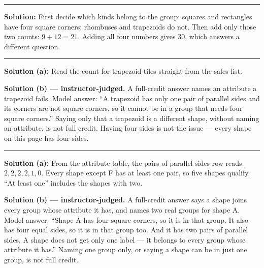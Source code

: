 \documentclass[12pt]{article}
\begin{document}
\vspace{0.15cm}\noindent\rule{\linewidth}{0.2pt}


\textbf{Solution:} First decide which kinds belong to the group: squares and rectangles have four
square corners; rhombuses and trapezoids do not. Then add only those two counts:
$9 + 12 = 21$. Adding all four numbers gives $30$, which answers a different question. 

\vspace{0.15cm}\noindent\rule{\linewidth}{0.2pt}


\textbf{Solution (a):} Read the count for trapezoid tiles straight from the sales list. 

\textbf{Solution (b) --- instructor-judged.} A full-credit answer names an attribute a trapezoid fails.
Model answer: ``A trapezoid has only one pair of parallel sides and its corners are not square
corners, so it cannot be in a group that needs four square corners.'' Saying only that a trapezoid is
a different shape, without naming an attribute, is not full credit. Having four sides is not the
issue --- every shape on this page has four sides.

\vspace{0.15cm}\noindent\rule{\linewidth}{0.2pt}


\textbf{Solution (a):} From the attribute table, the pairs-of-parallel-sides row reads
$2, 2, 2, 2, 1, 0$. Every shape except F has at least one pair, so five shapes qualify. ``At least
one'' includes the shapes with two. 

\textbf{Solution (b) --- instructor-judged.} A full-credit answer says a shape joins every group whose
attribute it has, and names two real groups for shape A. Model answer: ``Shape A has four square
corners, so it is in that group. It also has four equal sides, so it is in that group too. And it has
two pairs of parallel sides. A shape does not get only one label --- it belongs to every group whose
attribute it has.'' Naming one group only, or saying a shape can be in just one group, is not full
credit.
\end{document}
